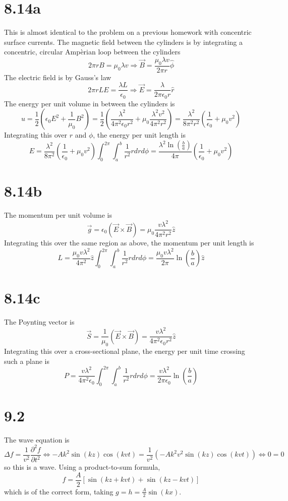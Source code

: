 \documentclass{article}
\begin{document}
\section*{8.14a}
This is almost identical to the problem on a previous homework with concentric surface currents. The magnetic field between the cylinders is by integrating a concentric, circular Amp\`erian loop between the cylinders
\[2\pi rB=\mu_0\lambda v\Rightarrow \vec{B}=\frac{\mu_0\lambda v}{2\pi r}\hat{\phi}\]
The electric field is by Gauss's law
\[2\pi r LE=\frac{\lambda L}{\epsilon_0}\Rightarrow \vec{E}=\frac{\lambda}{2\pi\epsilon_0 r}\hat{r}\]
The energy per unit volume in between the cylinders is
\[u=\frac{1}{2}\left( \epsilon_0E^2+\frac{1}{\mu_0}B^2 \right)=\frac{1}{2}\left( \frac{\lambda^2}{4\pi^2\epsilon_0r^2}+ \mu_0\frac{\lambda^2v^2}{4\pi^2r^2}\right)=\frac{\lambda^2}{8\pi^2r^2}\left( \frac{1}{\epsilon_0}+\mu_0v^2 \right)\]
Integrating this over $r$ and $\phi$, the energy per unit length is
\[E=\frac{\lambda^2}{8\pi^2}\left( \frac{1}{\epsilon_0}+\mu_0v^2 \right)\int_0^{2\pi}\int_a^b\frac{1}{r^2}rdrd\phi=\frac{\lambda^2\ln\left( \frac{b}{a} \right)}{4\pi}\left( \frac{1}{\epsilon_0}+\mu_0v^2 \right)\]

\section*{8.14b}
The momentum per unit volume is
\[\vec{g}=\epsilon_0\left( \vec{E}\times\vec{B} \right)=\mu_0\frac{v\lambda^2}{4\pi^2r^2}\hat{z}\]
Integrating this over the same region as above, the momentum per unit length is
\[L=\frac{\mu_0v\lambda^2}{4\pi^2}\hat{z}\int_0^{2\pi}\int_a^b\frac{1}{r^2} rdrd\phi=\frac{\mu_0v\lambda^2}{2\pi}\ln\left( \frac{b}{a} \right)\hat{z}\]

\section*{8.14c}
The Poynting vector is
\[\vec{S}=\frac{1}{\mu_0}\left( \vec{E}\times\vec{B} \right)=\frac{v\lambda^2}{4\pi^2\epsilon_0r^2}\hat{z}\]
Integrating this over a cross-sectional plane, the energy per unit time crossing such a plane is
\[P=\frac{v\lambda^2}{4\pi^2\epsilon_0}
  \int_0^{2\pi}\int_a^b\frac{1}{r^2}rdrd\phi=\frac{v\lambda^2}{2\pi\epsilon_0}\ln\left( \frac{b}{a} \right)\]

\section*{9.2}
The wave equation is
\[\Delta f=\frac{1}{v^2}\frac{\partial^2 f}{\partial t^2} \Leftrightarrow -Ak^2\sin(kz)\cos(kvt)=\frac{1}{v^2}\left( -Ak^2v^2\sin(kz)\cos(kvt) \right)\Leftrightarrow 0=0\]
so this is a wave.
Using a product-to-sum formula,
\[f=\frac{A}{2}\left[ \sin(kz+kvt)+\sin(kz-kvt) \right]\]
which is of the correct form, taking $g=h=\frac{A}{2}\sin(kx)$.
\end{document}
